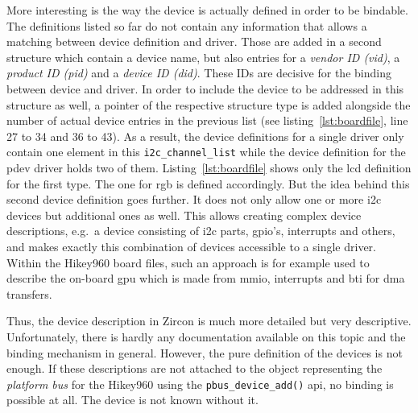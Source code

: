 More interesting is the way the device is actually defined in order to be bindable.
The definitions listed so far do not contain any information that allows a matching between device definition and driver.
Those are added in a second structure which contain a device name, but also entries for a \textit{vendor ID (vid)}, a \textit{product ID (pid)} and a \textit{device ID (did)}.
These IDs are decisive for the binding between device and driver.
In order to include the device to be addressed in this structure as well, a pointer of the respective structure type is added alongside the number of actual device entries in the previous list (see listing~\ref{lst:boardfile}, line 27 to 34 and 36 to 43).
%
As a result, the device definitions for a single driver only contain one element in this \texttt{i2c_channel_list} while the device definition for the pdev driver holds two of them.
Listing~\ref{lst:boardfile} shows only the \ac{lcd} definition for the first type.
The one for \ac{rgb} is defined accordingly.
But the idea behind this second device definition goes further.
It does not only allow one or more \ac{i2c} devices but additional ones as well.
This allows creating complex device descriptions, e.g.\ a device consisting of \ac{i2c} parts, \ac{gpio}'s, interrupts and others, and makes exactly this combination of devices accessible to a single driver.
Within the Hikey960 board files, such an approach is for example used to describe the on-board \ac{gpu} which is made from \ac{mmio}, interrupts and \ac{bti} for \ac{dma} transfers.

Thus, the device description in Zircon is much more detailed but very descriptive.
Unfortunately, there is hardly any documentation available on this topic and the binding mechanism in general.
However, the pure definition of the devices is not enough.
If these descriptions are not attached to the object representing the \textit{platform bus} for the Hikey960 using the \texttt{pbus_device_add()} \ac{api}, no binding is possible at all.
The device is not known without it.

